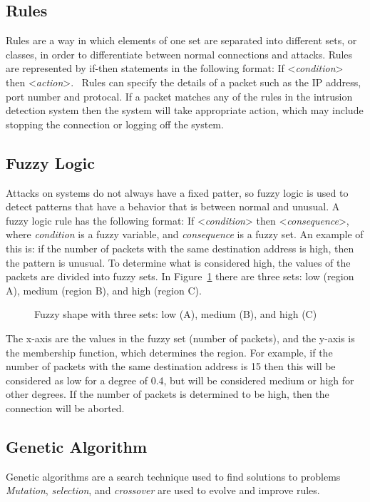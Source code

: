 \documentclass{sig-alternate}
\begin{document}
\subsection{Rules}
\label{sec:rules}
Rules are a way in which elements of one set are separated into different sets, or classes, in order to differentiate between normal connections and attacks. Rules are represented by if-then statements in the following format: If <\emph{condition}> then <\emph{action}>.~\cite{bapuji2012soft} Rules can specify the details of a packet such as the IP address, port number and protocal. If a packet matches any of the rules in the intrusion detection system then the system will take appropriate action, which may include stopping the connection or logging off the system.~\cite{DBLP:journals/corr/abs-1204-6416}




\subsection{Fuzzy Logic}
\label{sec:fuzzyLogic}
Attacks on systems do not always have a fixed patter, so fuzzy logic is used to detect patterns that have a behavior that is between normal and unusual. A fuzzy logic rule has the following format: If <\emph{condition}> then <\emph{consequence}>, where \emph{condition} is a fuzzy variable, and \emph{consequence} is a fuzzy set. An example of this is: if the number of packets with the same destination address is high, then the pattern is unusual. To determine what is considered high, the values of the packets are divided into fuzzy sets. In Figure~\ref{fig:triangleFigure} there are three sets: low (region A), medium (region B), and high (region C). 
\begin{figure}
\centering
{}
\caption{Fuzzy shape with three sets: low (A), medium (B), and high (C)~\cite{DBLP:journals/corr/abs-1204-6416}}
\label{fig:triangleFigure}
\end{figure}
The x-axis are the values in the fuzzy set (number of packets), and the y-axis is the membership function, which determines the region. For example, if the number of packets with the same destination address is 15 then this will be considered as low for a degree of 0.4, but will be considered medium or high for other degrees. If the number of packets is determined to be high, then the connection will be aborted.~\cite{DBLP:journals/corr/abs-1204-6416}




\subsection{Genetic Algorithm}
\label{sec:GA}
Genetic algorithms are a search technique used to find solutions to problems \emph{Mutation}, \emph{selection}, and \emph{crossover} are used to evolve and improve rules.
\end{document}
